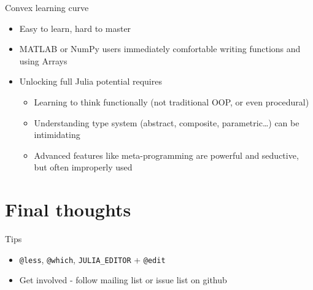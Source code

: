 \documentclass[compress,10pt]{beamer}
\begin{document}
\begin{frame}{Convex learning curve}

\begin{itemize}
\itemsep1pt\parskip0pt
\item
  Easy to learn, hard to master
\item
  MATLAB or NumPy users immediately comfortable writing functions and
  using Arrays
\item
  Unlocking full Julia potential requires

  \begin{itemize}
  \itemsep1pt\parskip0pt
  \item
    Learning to think functionally (not traditional OOP, or even
    procedural)
  \item
    Understanding type system (abstract, composite, parametric\ldots{})
    can be intimidating
  \item
    Advanced features like meta-programming are powerful and seductive,
    but often improperly used
  \end{itemize}
\end{itemize}

\end{frame}

\section{Final thoughts}\label{final-thoughts}

\begin{frame}{Tips}

\begin{itemize}
\itemsep1pt\parskip0pt
\item
  \texttt{@less}, \texttt{@which}, \texttt{JULIA\_EDITOR} +
  \texttt{@edit}
\item
  Get involved - follow mailing list or issue list on github
\end{itemize}

\end{frame}
\end{document}
